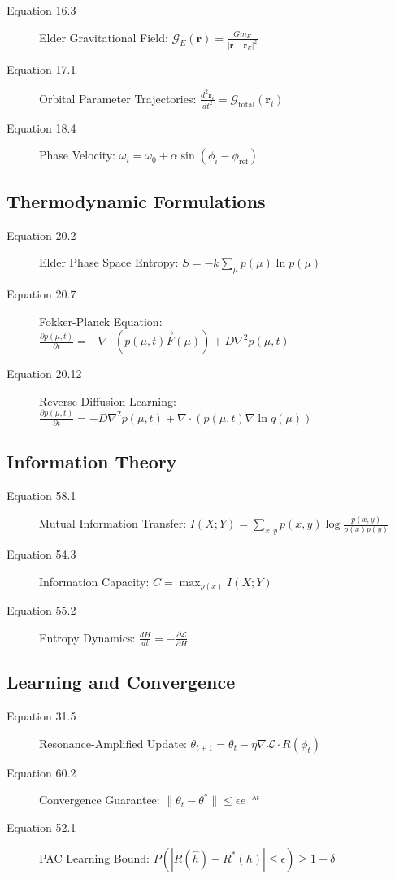 \begin{description}
\item[Equation 16.3] Elder Gravitational Field: $\mathcal{G}_E(\mathbf{r}) = \frac{G m_E}{|\mathbf{r} - \mathbf{r}_E|^2}$
\item[Equation 17.1] Orbital Parameter Trajectories: $\frac{d^2\mathbf{r}_i}{dt^2} = \mathcal{G}_{\text{total}}(\mathbf{r}_i)$
\item[Equation 18.4] Phase Velocity: $\omega_i = \omega_0 + \alpha \sin(\phi_i - \phi_{\text{ref}})$
\end{description}

\subsection{Thermodynamic Formulations}

\begin{description}
\item[Equation 20.2] Elder Phase Space Entropy: $S = -k \sum_{\mu} p(\mu) \ln p(\mu)$
\item[Equation 20.7] Fokker-Planck Equation: $\frac{\partial p(\mu, t)}{\partial t} = -\nabla \cdot (p(\mu, t) \vec{F}(\mu)) + D \nabla^2 p(\mu, t)$
\item[Equation 20.12] Reverse Diffusion Learning: $\frac{\partial p(\mu, t)}{\partial t} = -D \nabla^2 p(\mu, t) + \nabla \cdot (p(\mu, t) \nabla \ln q(\mu))$
\end{description}

\subsection{Information Theory}

\begin{description}
\item[Equation 58.1] Mutual Information Transfer: $I(X;Y) = \sum_{x,y} p(x,y) \log \frac{p(x,y)}{p(x)p(y)}$
\item[Equation 54.3] Information Capacity: $C = \max_{p(x)} I(X;Y)$
\item[Equation 55.2] Entropy Dynamics: $\frac{dH}{dt} = -\frac{\partial \mathcal{L}}{\partial H}$
\end{description}

\subsection{Learning and Convergence}

\begin{description}
\item[Equation 31.5] Resonance-Amplified Update: $\theta_{t+1} = \theta_t - \eta \nabla \mathcal{L} \cdot R(\phi_t)$
\item[Equation 60.2] Convergence Guarantee: $\|\theta_t - \theta^*\| \leq \epsilon e^{-\lambda t}$
\item[Equation 52.1] PAC Learning Bound: $P(|R(\hat{h}) - R^*(h)| \leq \epsilon) \geq 1 - \delta$
\end{description}

